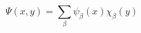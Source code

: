 \begin{equation}
\Psi(x,y) = \sum_{\beta}\psi_{\beta}(x) \chi_{\beta}(y)
\label{2.19a}
\end{equation}

